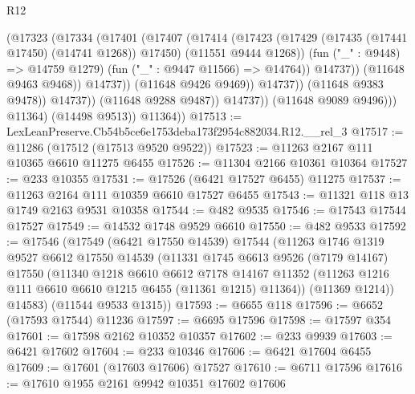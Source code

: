 \begin{lexlean}{R12}
\begin{coremodule}
                                    (@17323
                                      (@17334
                                        (@17401
                                          (@17407
                                            (@17414
                                              (@17423
                                                (@17429
                                                  (@17435 (@17441 @17450) (@14741 @1268))
                                                  @17450)
                                                (@11551 @9444 @1268))
                                              (fun ("_" : @9448) => @14759 @1279)
                                              (fun ("_" : @9447 @11566) => @14764))
                                            @14737))
                                        (@11648 @9463 @9468))
                                      @14737))
                                  (@11648 @9426 @9469))
                                @14737))
                            (@11648 @9383 @9478))
                          @14737))
                      (@11648 @9288 @9487))
                    @14737))
                (@11648 @9089 @9496)))
            @11364)
          (@14498 @9513))
        @11364))
@17513 := LexLeanPreserve.Cb54b5ce6e1753deba173f2954c882034.R12.__rel_3
@17517 := @11286 (@17512 (@17513 @9520 @9522))
@17523 := @11263 @2167 @111 @10365 @6610 @11275 @6455
@17526 := @11304 @2166 @10361 @10364
@17527 := @233 @10355
@17531 := @17526 (@6421 @17527 @6455) @11275
@17537 := @11263 @2164 @111 @10359 @6610 @17527 @6455
@17543 := @11321 @118 @13 @1749 @2163 @9531 @10358
@17544 := @482 @9535
@17546 := @17543 @17544 @17527
@17549 := @14532 @1748 @9529 @6610
@17550 := @482 @9533
@17592 := @17546
    (@17549
      (@6421 @17550 @14539)
      @17544
      (@11263
        @1746
        @1319
        @9527
        @6612
        @17550
        @14539
        (@11331
          @1745
          @6613
          @9526
          (@7179 @14167)
          @17550
          (@11340
            @1218
            @6610
            @6612
            @7178
            @14167
            @11352
            (@11263 @1216 @111 @6610 @6610 @1215 @6455 (@11361 @1215) @11364))
          (@11369 @1214))
        @14583)
      (@11544 @9533 @1315))
@17593 := @6655 @118
@17596 := @6652 (@17593 @17544) @11236
@17597 := @6695 @17596
@17598 := @17597 @354
@17601 := @17598 @2162 @10352 @10357
@17602 := @233 @9939
@17603 := @6421 @17602
@17604 := @233 @10346
@17606 := @6421 @17604 @6455
@17609 := @17601 (@17603 @17606) @17527
@17610 := @6711 @17596
@17616 := @17610 @1955 @2161 @9942 @10351 @17602 @17606

\end{coremodule}
\end{lexlean}
